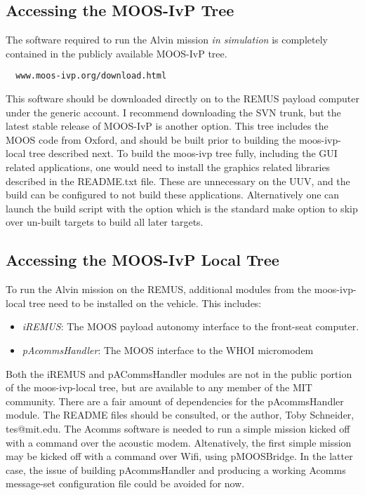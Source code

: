 \subsection{Accessing the MOOS-IvP Tree}

The software required to run the Alvin mission {\em in simulation} is
completely contained in the publicly available MOOS-IvP tree.

\footnotesize
\begin{verbatim}
  www.moos-ivp.org/download.html
\end{verbatim}
\normalsize

This software should be downloaded directly on to the REMUS payload
computer under the  generic account. I recommend downloading
the SVN trunk, but the latest stable release of MOOS-IvP is another 
option. This tree includes the MOOS code from Oxford, and should be
built prior to building the moos-ivp-local tree described next. To 
build the moos-ivp tree fully, including the GUI related applications, 
one would need to install the graphics related libraries described
in the README.txt file. These are unnecessary on the UUV, and the
build can be configured to not build these applications. Alternatively
one can launch the build script with the  option which is 
the standard make option to skip over un-built targets to build all
later targets. 


\subsection{Accessing the MOOS-IvP Local Tree}

To run the Alvin mission on the REMUS, additional modules from the
moos-ivp-local tree need to be installed on the vehicle. This includes:

\begin{itemize}
\item {\em iREMUS}: The MOOS payload autonomy interface to the
  front-seat computer.
\item {\em pAcommsHandler}: The MOOS interface to the WHOI micromodem
\end{itemize}

Both the iREMUS and pACommsHandler modules are not in the public
portion of the moos-ivp-local tree, but are available to any member of
the MIT community. There are a fair amount of dependencies for the
pAcommsHandler module. The README files should be consulted, or the
author, Toby Schneider, tes@mit.edu. The Acomms software is needed 
to run a simple mission kicked off with a command over the acoustic
modem. Altenatively, the first simple mission may be kicked off with 
a command over Wifi, using pMOOSBridge. In the latter case, the issue
of building pAcommsHandler and producing a working Acomms message-set 
configuration file could be avoided for now.

